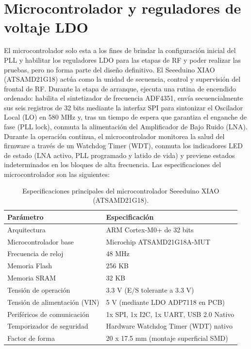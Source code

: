 \documentclass[11pt,a4paper,twoside]{report}
\begin{document}
	\section{Microcontrolador y reguladores de voltaje LDO}
	El microcontrolador solo esta a los fines de brindar la configuración inicial del PLL y habilitar los reguladores LDO para las etapas de RF y poder realizar las pruebas, pero no forma parte del diseño definitivo. El Seeeduino XIAO (ATSAMD21G18) actúa como la unidad de secuencia, control y supervisión del frontal de RF. Durante la etapa de arranque, ejecuta una rutina de encendido ordenado: habilita el sintetizador de frecuencia ADF4351, envía secuencialmente sus seis registros de 32 bits mediante la interfaz SPI para sintonizar el Oscilador Local (LO) en 580 MHz y, tras un tiempo de espera que garantiza el enganche de fase (PLL lock), conmuta la alimentación del Amplificador de Bajo Ruido (LNA). Durante la operación continua, el microcontrolador monitorea la salud del firmware a través de un Watchdog Timer (WDT), conmuta los indicadores LED de estado (LNA activo, PLL programado y latido de vida) y previene estados indeterminados en los bloques de alta frecuencia. Las especificaciones del microcontrolador son las siguientes:
	
	\begin{table}[htbp]
		\centering
		\label{tab:specs_seeeduino_xiao}
		\begin{tabular}{ll}
			\hline
			\textbf{Parámetro} & \textbf{Especificación} \\ \hline
			Arquitectura & ARM Cortex-M0+ de 32 bits \\
			Microcontrolador base & Microchip ATSAMD21G18A-MUT \\
			Frecuencia de reloj & 48 MHz \\
			Memoria Flash & 256 KB \\
			Memoria SRAM & 32 KB \\
			Tensión de operación & 3.3 V (E/S tolerante a 3.3 V) \\
			Tensión de alimentación (VIN) & 5 V (mediante LDO ADP7118 en PCB) \\
			Periféricos de comunicación & 1x SPI, 1x I2C, 1x UART, USB 2.0 Nativo \\
			Temporizador de seguridad & Hardware Watchdog Timer (WDT) nativo \\
			Factor de forma & 20 x 17.5 mm (montaje superficial SMD) \\ \hline
		\end{tabular}
		\caption{Especificaciones principales del microcontrolador Seeeduino XIAO (ATSAMD21G18).}
	\end{table}
	
\end{document}
